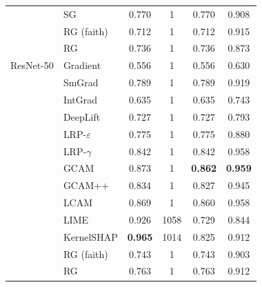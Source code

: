 \begin{tabular}{@{}l l c c c c@{}}
 & SG & 0.770 & 1 & 0.770 & 0.908 \\
 & RG (faith) & 0.712 & 1 & 0.712 & 0.915 \\
 & RG & 0.736 & 1 & 0.736 & 0.873 \\
\midrule
ResNet-50 & Gradient & 0.556 & 1 & 0.556 & 0.630 \\
 & SmGrad & 0.789 & 1 & 0.789 & 0.919 \\
 & IntGrad & 0.635 & 1 & 0.635 & 0.743 \\
 & DeepLift & 0.727 & 1 & 0.727 & 0.793 \\
 & LRP-$\varepsilon$ & 0.775 & 1 & 0.775 & 0.880 \\
 & LRP-$\gamma$ & 0.842 & 1 & 0.842 & 0.958 \\
 & GCAM & 0.873 & 1 & \textbf{0.862} & \textbf{0.959} \\
 & GCAM++ & 0.834 & 1 & 0.827 & 0.945 \\
 & LCAM & 0.869 & 1 & 0.860 & 0.958 \\
 & LIME & 0.926 & 1058 & 0.729 & 0.844 \\
 & KernelSHAP & \textbf{0.965} & 1014 & 0.825 & 0.912 \\
 & RG (faith) & 0.743 & 1 & 0.743 & 0.903 \\
 & RG & 0.763 & 1 & 0.763 & 0.912 \\
\bottomrule
\end{tabular}
